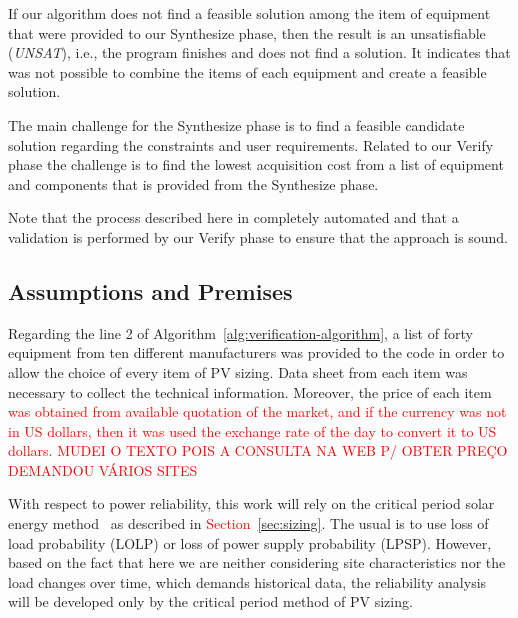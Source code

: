 \documentclass[review]{elsarticle}
\begin{document}
If our algorithm does not find a feasible solution among the item of equipment that were provided to our {\sc Synthesize} phase,  then the result is an unsatisfiable (\textit{UNSAT}), i.e., the program finishes and does not find a solution. It indicates that was not possible to combine the items of each equipment and create a feasible solution. 

The main challenge for the {\sc Synthesize} phase is to find a feasible candidate solution regarding the constraints and user requirements. Related to our {\sc Verify} phase the challenge is to find the lowest acquisition cost from a list of equipment and components that is provided from the {\sc Synthesize} phase. 

Note that the process described here in completely automated and that a validation is performed by our {\sc Verify} phase to ensure that the approach is sound.

\subsection{Assumptions and Premises}
Regarding the line 2 of Algorithm~\ref{alg:verification-algorithm}, a list of forty equipment from ten different manufacturers was provided to the code in order to allow the choice of every item of PV sizing. Data sheet from each item was necessary to collect the technical information. Moreover, the price of each item \textcolor{red}{was obtained from available quotation of the market, and if the currency was not in US dollars, then it was used the exchange rate of the day to convert it to US dollars. MUDEI O TEXTO POIS A CONSULTA NA WEB P/ OBTER PREÇO DEMANDOU VÁRIOS SITES}

With respect to power reliability, this work will rely on the critical period solar energy method~\cite{Pinho} as described in \textcolor{red}{Section~\ref{sec:sizing}}. The usual is to use loss of load probability (LOLP) or loss of power supply probability (LPSP). However, based on the fact that here we are neither considering site characteristics nor the load changes over time, which demands historical data, the reliability analysis will be developed only by the critical period method of PV sizing.
\end{document}
